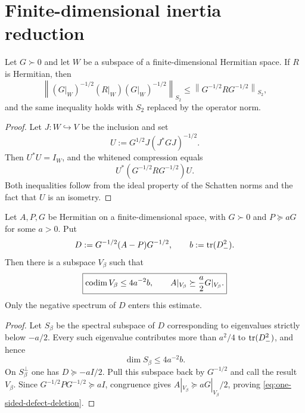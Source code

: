 \section{Finite-dimensional inertia reduction}
\label{sec:minmax}

\begin{lemma}
\label{lem:relative-compression}
Let $G\succ0$ and let $W$ be a subspace of a finite-dimensional Hermitian
space.  If $R$ is Hermitian, then
\[
\left\|(G|_W)^{-1/2}(R|_W)(G|_W)^{-1/2}\right\|_{S_2}
\le \left\|G^{-1/2}RG^{-1/2}\right\|_{S_2},
\]
and the same inequality holds with $S_2$ replaced by the operator norm.
\end{lemma}

\begin{proof}
Let $J:W\hookrightarrow V$ be the inclusion and set
\[
U:=G^{1/2}J(J^*GJ)^{-1/2}.
\]
Then $U^*U=I_W$, and the whitened compression equals
\[
U^*(G^{-1/2}RG^{-1/2})U.
\]
Both inequalities follow from the ideal property of the Schatten norms and
the fact that $U$ is an isometry.
\end{proof}

\begin{lemma}
\label{lem:one-sided-defect-deletion}
Let $A,P,G$ be Hermitian on a finite-dimensional space, with $G\succ0$ and
$P\succeq aG$ for some $a>0$.  Put
\[
D:=G^{-1/2}(A-P)G^{-1/2},
\qquad b:=\operatorname{tr}(D_-^2).
\]
Then there is a subspace $V_\beta$ such that
\begin{equation}
\boxed{
\operatorname{codim} V_\beta\le4a^{-2}b,
\qquad A|_{V_\beta}\succeq\frac a2G|_{V_\beta}.}
\label{eq:one-sided-defect-deletion}
\end{equation}
Only the negative spectrum of $D$ enters this estimate.
\end{lemma}

\begin{proof}
Let $S_\beta$ be the spectral subspace of $D$ corresponding to eigenvalues
strictly below $-a/2$.  Every such eigenvalue contributes more than $a^2/4$
to $\operatorname{tr}(D_-^2)$, and hence
\[
\dim S_\beta\le4a^{-2}b.
\]
On $S_\beta^\perp$ one has $D\succeq-aI/2$.  Pull this subspace back by
$G^{-1/2}$ and call the result $V_\beta$.  Since
$G^{-1/2}PG^{-1/2}\succeq aI$, congruence gives
$A|_{V_\beta}\succeq aG|_{V_\beta}/2$, proving
\eqref{eq:one-sided-defect-deletion}.
\end{proof}

